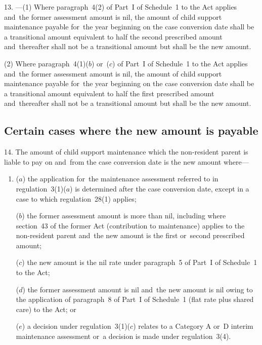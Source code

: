 \documentclass[12pt,a4paper]{article}
\begin{document}
13.%
---(1)  %
Where paragraph~4(2) of Part~I of Schedule~1 to the Act applies and~the former assessment amount is nil, the amount of child support maintenance payable for~the year beginning on the case conversion date shall be a transitional amount equivalent to half the second prescribed amount and~thereafter shall not be a transitional amount but shall be the new amount.

(2) Where paragraph~4(1)($b$)  or~($c$)  of Part~I of Schedule~1 to the Act applies and~the former assessment amount is nil, the amount of child support maintenance payable for~the year beginning on the case conversion date shall be a transitional amount equivalent to half the first prescribed amount and~thereafter shall not be a transitional amount but shall be the new amount.


\subsection[14. Certain cases where the new amount is payable]{Certain cases where the new amount is payable}

14.  The amount of child support maintenance which the non-resident parent is liable to pay on and~from the case conversion date is the new amount where—
\begin{enumerate}\item[]
($a$) the application for~the maintenance assessment referred to in regulation~3(1)($a$)  is determined after the case conversion date, except in a case to which regulation~28(1) applies;

($b$) the former assessment amount is more than nil, including where section~43 of the former Act (contribution to maintenance) applies to the non-resident parent and~the new amount is the first or~second prescribed amount;

($c$) the new amount is the nil rate under paragraph~5 of Part~I of Schedule~1 to the Act; 

($d$) the former assessment amount is nil and~the new amount is nil owing to the application of paragraph~8 of Part~I of Schedule~1 (flat rate plus shared care) to the Act; or

($e$) a decision under regulation~3(1)($c$)  relates to a Category A or~D interim maintenance assessment or~a decision is made under regulation~3(4).
\end{enumerate}
\end{document}
